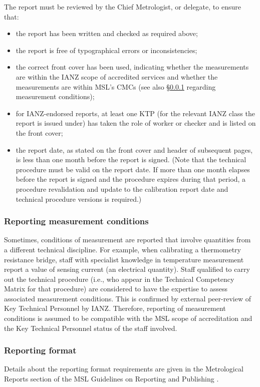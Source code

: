 The report must be reviewed by the Chief Metrologist, or delegate, to ensure that:
\begin{itemize}
\item the report has been written and checked as required above;
\item the report is free of typographical errors or inconsistencies;
\item the correct front cover has been used, indicating whether the measurements are within the IANZ scope of accredited services and whether the measurements are within MSL's CMCs (see also \S\ref{sss:measurement_conditions} regarding measurement conditions);
\item for IANZ-endorsed reports, at least one KTP (for the relevant IANZ class the report is issued under) has taken the role of worker or checker and is listed on the front cover;
\item the report date, as stated on the front cover and header of subsequent pages, is less than one month before the report is signed. (Note that the technical procedure must be valid on the report date. If more than one month elapses before the report is signed and the procedure expires during that period, a procedure revalidation and update to the calibration report date and technical procedure versions is required.)
\end{itemize} 

\subsubsection{Reporting measurement conditions}
\label{sss:measurement_conditions}
Sometimes, conditions of measurement are reported that involve quantities from a different technical discipline. For example, when calibrating a thermometry resistance bridge, staff with specialist knowledge in temperature measurement report a value of sensing current (an electrical quantity). Staff qualified to carry out the technical procedure (i.e., who appear in the Technical Competency Matrix for that procedure) are considered to have the expertise to assess associated measurement conditions. This is confirmed by external peer-review of Key Technical Personnel by IANZ. Therefore, reporting of measurement conditions is assumed to be compatible with the MSL scope of accreditation and the Key Technical Personnel status of the staff involved.

\subsubsection{Reporting format}
Details about the reporting format requirements are given in the Metrological Reports section of the MSL Guidelines on Reporting and Publishing \cite[\S\ref*{GRP-s:metrological_reports}]{MSL_Reporting_Guidelines}.

